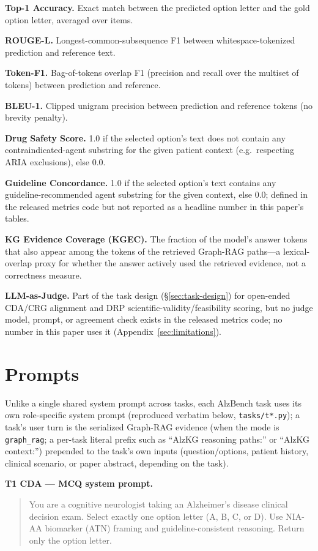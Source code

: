 \documentclass{article}
\begin{document}
\textbf{Top-1 Accuracy.} Exact match between the predicted option letter and the gold option letter, averaged over items.

\textbf{ROUGE-L.} Longest-common-subsequence F1 between whitespace-tokenized prediction and reference text.

\textbf{Token-F1.} Bag-of-tokens overlap F1 (precision and recall over the multiset of tokens) between prediction and reference.

\textbf{BLEU-1.} Clipped unigram precision between prediction and reference tokens (no brevity penalty).

\textbf{Drug Safety Score.} 1.0 if the selected option's text does not contain any contraindicated-agent substring for the given patient context (e.g.\ respecting ARIA exclusions), else 0.0.

\textbf{Guideline Concordance.} 1.0 if the selected option's text contains any guideline-recommended agent substring for the given context, else 0.0; defined in the released metrics code but not reported as a headline number in this paper's tables.

\textbf{KG Evidence Coverage (KGEC).} The fraction of the model's answer tokens that also appear among the tokens of the retrieved Graph-RAG paths---a lexical-overlap proxy for whether the answer actively used the retrieved evidence, not a correctness measure.

\textbf{LLM-as-Judge.} Part of the task design (\S\ref{sec:task-design}) for open-ended CDA/CRG alignment and DRP scientific-validity/feasibility scoring, but no judge model, prompt, or agreement check exists in the released metrics code; no number in this paper uses it (Appendix~\ref{sec:limitations}).

\newpage
\section{Prompts}
\label{app:prompts}
Unlike a single shared system prompt across tasks, each AlzBench task uses its own role-specific system prompt (reproduced verbatim below, \texttt{tasks/t*.py}); a task's user turn is the serialized Graph-RAG evidence (when the mode is \texttt{graph\_rag}; a per-task literal prefix such as ``AlzKG reasoning paths:'' or ``AlzKG context:'') prepended to the task's own inputs (question/options, patient history, clinical scenario, or paper abstract, depending on the task).

\textbf{T1 CDA --- MCQ system prompt.}
\begin{quote}\ttfamily\footnotesize
You are a cognitive neurologist taking an Alzheimer's disease clinical decision exam.
Select exactly one option letter (A, B, C, or D). Use NIA-AA biomarker (ATN) framing and guideline-consistent reasoning.
Return only the option letter.
\end{quote}
\end{document}
